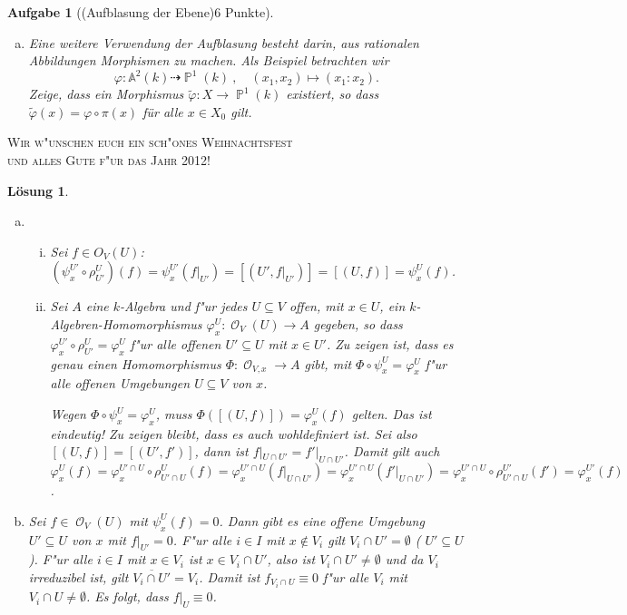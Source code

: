 \documentclass[a4paper, 12pt, numbers=noendperiod, chapterprefix=true]{scrbook}
\theoremstyle{break}
\newtheorem{Aufg}{Aufgabe}
\newtheorem{Loes}{L\"osung}
\theoremstyle{nonumberbreak}
\theoremstyle{nonumberplain}
\newcommand{\A}{\mathbb{A}}
\newcommand{\Affine}{\mathbb{A}} %
\DeclareMathOperator{\Projective}{\mathbb{P}} %
\DeclareMathOperator{\Reg}{\mathcal{O}} %
\begin{document}
\begin{Aufg}[(Aufblasung der Ebene)6 Punkte]
\begin{enumerate}[a)]
	Zeige, dass sich die strikten Transformierten der $x$- und der $y$-Achse in $X$ nicht mehr schneiden.
	\item Eine weitere Verwendung der Aufblasung besteht darin, aus rationalen Abbildungen Morphismen zu machen. Als Beispiel betrachten wir
		\[\varphi:\Affine^2(k) \dashrightarrow \Projective^1(k)\ , \quad (x_1,x_2) \mapsto (x_1:x_2).\]
	Zeige, dass ein Morphismus $\tilde\varphi: X\to \Projective^1(k)$ existiert, so dass $\tilde\varphi(x) = \varphi\circ \pi(x)$ für alle $x\in X_0$ gilt.
\end{enumerate}\end{Aufg}

\begin{center}

\vspace{5mm}
\textsc{\Large Wir w"unschen euch ein sch"ones Weihnachtsfest \\[1ex]
und alles Gute f"ur das Jahr 2012!
}
\end{center}

\begin{Loes}\begin{enumerate}[a)]
\item
	\begin{enumerate}[i)]
	\item
		Sei $f \in O_V(U)$: $(\psi_x^{U'} \circ \rho^U_{U'})(f) = \psi_x^{U'}(f|_{U'}) = [(U', f|_{U'})] = [(U,f)] = \psi_x^U(f)$. 
	\item
		Sei $A$ eine $k$-Algebra und f"ur jedes $U \subseteq V$ offen, mit $x \in U$, ein $k$-Algebren-Homomorphismus $\varphi_x^U\colon \Reg_V(U) \to A$ gegeben, so dass $\varphi_x^{U'} \circ \rho^U_{U'} = \varphi_x^U$ f"ur alle offenen $U' \subseteq U$ mit $x \in U'$. Zu zeigen ist, dass es genau einen Homomorphismus $\Phi : \Reg_{V,x} \to A$ gibt, mit $\Phi \circ \psi_x^U = \varphi_x^U$ f"ur alle offenen Umgebungen $U \subseteq V$ von $x$.

		Wegen $\Phi \circ \psi_x^U = \varphi_x^U$, muss $\Phi([(U,f)]) = \varphi_x^U(f)$ gelten. Das ist eindeutig! Zu zeigen bleibt, dass es auch wohldefiniert ist. Sei also $[(U,f)] = [(U', f')]$, dann ist $f|_{U \cap U'} = f'|_{U \cap U'}$. Damit gilt auch $\varphi_x^U(f) = \varphi_x^{U'\cap U} \circ \rho^U_{U'\cap U} (f) = \varphi_x^{U'\cap U}(f|_{U \cap U'}) = \varphi_x^{U'\cap U}(f'|_{U \cap U'}) = \varphi_x^{U'\cap U} \circ \rho^{U'}_{U'\cap U}(f') = \varphi_x^{U'}(f)$.
	\end{enumerate}
\item
	Sei $f \in \Reg_V(U)$ mit $\psi_x^U(f) = 0$. Dann gibt es eine offene Umgebung $U' \subseteq U$ von $x$ mit $f|_{U'} = 0$. F"ur alle $i \in I$ mit $x \notin V_i$ gilt $V_i \cap U' = \emptyset$ ( $U' \subseteq U$). F"ur alle $i \in I$ mit $x \in V_i$ ist $x \in V_i \cap U'$, also ist $V_i \cap U' \neq \emptyset$ und da $V_i$ irreduzibel ist, gilt $\overline{V_i \cap U'} = V_i$. Damit ist $f_{V_i \cap U} \equiv 0$ f"ur alle $V_i$ mit $V_i \cap U \neq \emptyset$. Es folgt, dass $f|_U \equiv 0$. 
\end{enumerate}\end{Loes}
\end{document}
